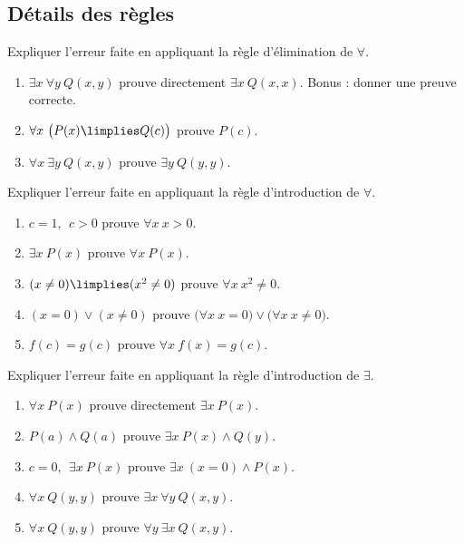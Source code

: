 \documentclass[11pt,class=report,crop=false]{standalone}
\begin{document}
\subsection*{Détails des règles}


\begin{exercicecours}
Expliquer l'erreur faite en appliquant la règle d'élimination de $\forall$.
\begin{enumerate}
	\item $\exists x \ \forall y \ Q(x,y)$ prouve directement $\exists x \ Q(x,x)$. Bonus : donner une preuve correcte.
	
	\item $\forall x \ \big( P(x) \limplies Q(c) \big)$ prouve $P(c)$.
	
	\item $\forall x \ \exists y \  Q(x,y)$ prouve $\exists y \  Q(y,y)$.
\end{enumerate}
\end{exercicecours}


\begin{exercicecours}
Expliquer l'erreur faite	en appliquant la règle d'introduction de $\forall$.
\begin{enumerate}
	\item $c=1, \ \ c > 0$ prouve $\forall x \ x> 0$. 
	
	\item $\exists x \ P(x)$ prouve $\forall x \ P(x)$. 
	
	\item $(x \neq 0) \limplies (x^2 \neq 0)$ prouve $\forall x \ x^2 \neq 0$. 
	
	\item $(x = 0) \lor (x \neq 0)$ prouve $\big( \forall x \ x = 0 \big) \lor \big( \forall x \ x \neq 0 \big)$. 		
	
	\item $f(c)=g(c)$ prouve $\forall x \ f(x)=g(c)$. 
\end{enumerate}
\end{exercicecours}


\begin{exercicecours}
Expliquer l'erreur faite	en appliquant la règle d'introduction de $\exists$.
\begin{enumerate}
	\item $\forall x \ P(x)$ prouve directement $\exists x \ P(x)$. 
	
	\item $P(a) \land Q(a)$ prouve $\exists x \ P(x) \land Q(y)$.
	
	\item $c=0, \ \ \exists x \ P(x)$ prouve $\exists x \ (x=0) \land P(x)$.
	
	\item $\forall x \ Q(y,y)$ prouve $\exists x \ \forall y \ Q(x,y)$.
	
	\item $\forall x \ Q(y,y)$ prouve $\forall y \ \exists x \ Q(x,y)$.		
	
\end{enumerate}
\end{exercicecours}
\end{document}

